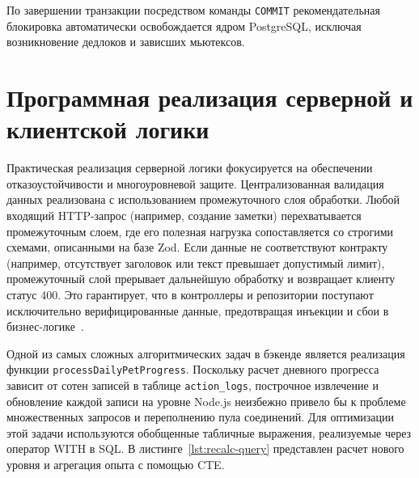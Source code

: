\documentclass[a4paper,14pt]{extreport}
\begin{document}
По завершении транзакции посредством команды \texttt{COMMIT} рекомендательная блокировка автоматически освобождается ядром PostgreSQL, исключая возникновение дедлоков и зависших мьютексов.

\section{Программная реализация серверной и клиентской логики}

Практическая реализация серверной логики фокусируется на обеспечении отказоустойчивости и многоуровневой защите. Централизованная валидация данных реализована с использованием промежуточного слоя обработки. Любой входящий HTTP-запрос (например, создание заметки) перехватывается промежуточным слоем, где его полезная нагрузка сопоставляется со строгими схемами, описанными на базе Zod. Если данные не соответствуют контракту (например, отсутствует заголовок или текст превышает допустимый лимит), промежуточный слой прерывает дальнейшую обработку и возвращает клиенту статус 400. Это гарантирует, что в контроллеры и репозитории поступают исключительно верифицированные данные, предотвращая инъекции и сбои в бизнес-логике~\cite{ref_kashyaro}.

Одной из самых сложных алгоритмических задач в бэкенде является реализация функции \texttt{processDailyPetProgress}. Поскольку расчет дневного прогресса зависит от сотен записей в таблице \texttt{action\_logs}, построчное извлечение и обновление каждой записи на уровне Node.js неизбежно привело бы к проблеме множественных запросов и переполнению пула соединений. Для оптимизации этой задачи используются обобщенные табличные выражения, реализуемые через оператор WITH в SQL. В листинге~\ref{lst:recalc-query} представлен расчет нового уровня и агрегация опыта с помощью CTE.
\end{document}
